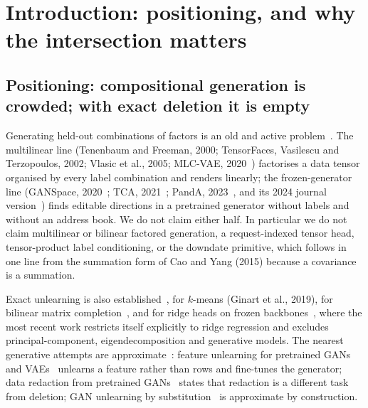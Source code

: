 \documentclass{article} %
\begin{document}
\section{Introduction: positioning, and why the intersection matters}
\label{sec:intro}

\subsection{Positioning: compositional generation is crowded; with exact deletion it is empty}
\label{sec:positioning}

Generating held-out combinations of factors is an old and active problem~\citep{du2020compositional,liu2022compositional,du2023reduce,okawa2023compositional}. The multilinear
line (Tenenbaum and Freeman, 2000\nocite{tenenbaum2000separating}; TensorFaces, Vasilescu and Terzopoulos, 2002\nocite{vasilescu2002tensorfaces}; Vlasic et
al., 2005\nocite{vlasic2005face}; MLC-VAE, 2020~\citep{georgopoulos2020multilinear}) factorises a data tensor organised by every label combination and
renders linearly; the frozen-generator line (GANSpace, 2020~\citep{harkonen2020ganspace}; TCA, 2021~\citep{oldfield2021tensor}; PandA, 2023~\citep{oldfield2023panda}, and its
2024 journal version~\citep{oldfield2024bilinear}) finds editable directions in a pretrained generator without labels and
without an address book. We do not claim either half. In particular we do not claim
multilinear or bilinear factored generation, a request-indexed tensor head, tensor-product
label conditioning, or the downdate primitive, which follows in one line from the summation
form of Cao and Yang (2015)\nocite{cao2015towards} because a covariance is a summation.

Exact unlearning is also established~\citep{nguyen2025survey}, for $k$-means (Ginart et al., 2019\nocite{ginart2019making}), for bilinear
matrix completion~\citep{xu2023netflix}, and for ridge heads on frozen backbones~\citep{quan2026exact}, where the most recent work
restricts itself explicitly to ridge regression and excludes principal-component,
eigendecomposition and generative models. The nearest generative attempts are approximate~\citep{kong2022approximate}:
feature unlearning for pretrained GANs and VAEs~\citep{moon2024feature} unlearns a feature rather than rows and
fine-tunes the generator; data redaction from pretrained GANs~\citep{kong2023data} states that redaction is a
different task from deletion; GAN unlearning by substitution~\citep{sun2025generative} is approximate by construction.
\end{document}
